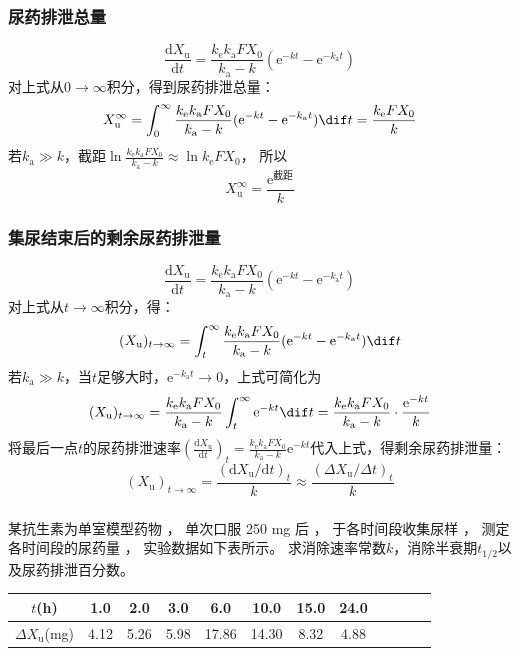 \documentclass[dvipsnames, svgnames, x11names]{beamer}
\begin{document}
\begin{frame}
    \frametitle{尿药排泄总量}
    \[
        \frac{\mathrm{d}X_\mathrm{u}}{\mathrm{d}t}=\frac{k_\mathrm{e}k_\mathrm{a}FX_0}{k_\mathrm{a}-k}(\mathrm{e}^{-kt}-\mathrm{e}^{-k_\mathrm{a}t})
    \]
    对上式从$0 \to \infty$积分，得到尿药排泄总量：
    \[
        X_\mathrm{u}^\infty = \int_0^\infty \frac{k_\mathrm{e}k_\mathrm{a}FX_0}{k_\mathrm{a}-k}(\mathrm{e}^{-kt}-\mathrm{e}^{-k_\mathrm{a}t}) \dif t = \frac{k_\mathrm{e}FX_0}{k}
    \]
    若$k_\mathrm{a}\gg k$，截距$\ln \frac{k_\mathrm{e}k_\mathrm{a}FX_0}{k_\mathrm{a}-k} \approx \ln k_\mathrm{e}FX_0$，
    所以
    \[
        X_\mathrm{u}^\infty = \frac{\mathrm{e}^{\text{截距}}}{k}
    \]
\end{frame}


\begin{frame}
    \frametitle{集尿结束后的剩余尿药排泄量}
    \[
        \frac{\mathrm{d}X_\mathrm{u}}{\mathrm{d}t}=\frac{k_\mathrm{e}k_\mathrm{a}FX_0}{k_\mathrm{a}-k}(\mathrm{e}^{-kt}-\mathrm{e}^{-k_\mathrm{a}t})
    \]
    对上式从$t \to \infty$积分，得：
    \[
        (X_\mathrm{u})_{t \to \infty} = \int_t^\infty \frac{k_\mathrm{e}k_\mathrm{a}FX_0}{k_\mathrm{a}-k}(\mathrm{e}^{-kt}-\mathrm{e}^{-k_\mathrm{a}t}) \dif t
    \]
    若$k_\mathrm{a}\gg k$，当$t$足够大时，$\mathrm{e}^{-k_\mathrm{a}t} \to 0$，上式可简化为
    \[
        (X_\mathrm{u})_{t \to \infty} = \frac{k_\mathrm{e}k_\mathrm{a}FX_0}{k_\mathrm{a}-k}\int_t^\infty \mathrm{e}^{-kt} \dif t = \frac{k_\mathrm{e}k_\mathrm{a}FX_0}{k_\mathrm{a}-k}\cdot \frac{\mathrm{e}^{-kt}}{k}
    \]
    将最后一点$t$的尿药排泄速率$(\frac{\mathrm{d}X_\mathrm{u}}{\mathrm{d}t})_t=\frac{k_\mathrm{e}k_\mathrm{a}FX_0}{k_\mathrm{a}-k}\mathrm{e}^{-kt}$代入上式，得剩余尿药排泄量：
    \[
        (X_\mathrm{u})_{t \to \infty} = \frac{(\mathrm{d}X_\mathrm{u}/\mathrm{d}t)_t}{k} \approx \frac{(\Delta X_\mathrm{u}/\Delta t)_t}{k} 
    \]
\end{frame}


\begin{frame}[t]
    \frametitle{}
    \begin{example}
        某抗生素为单室模型药物 ， 单次口服 250 mg 后 ， 于各时间段收集尿样 ， 测定各时间段的尿药量 ， 实验数据如下表所示。 求消除速率常数$k$，消除半衰期$t_{1/2}$以及尿药排泄百分数。
        \begin{table}
            \centering
            \begin{tabular}{cccccccccccc}
                \bottomrule
                $t$(h) & 1.0 & 2.0 & 3.0 & 6.0 & 10.0 & 15.0 & 24.0  \\ \hline
                $\Delta X_\mathrm{u}$(mg) & 4.12 & 5.26 & 5.98 & 17.86 & 14.30 & 8.32 & 4.88 \\ \toprule 
            \end{tabular}
        \end{table}
    \end{example}
\end{frame}
\end{document}
